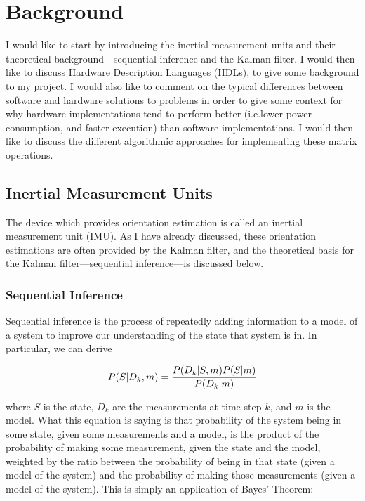 \documentclass[12pt]{article}
\begin{document}
\section{Background}

I would like to start by introducing the inertial measurement units and their theoretical background---sequential inference and the Kalman filter. I would then like to discuss Hardware Description Languages (HDLs), to give some background to my project. I would also like to comment on the typical differences between software and hardware solutions to problems in order to give some context for why hardware implementations tend to perform better (i.e.\@ lower power consumption, and faster execution) than software implementations. I would then like to discuss the different algorithmic approaches for implementing these matrix operations.

\subsection{Inertial Measurement Units}

The device which provides orientation estimation is called an inertial measurement unit (IMU). As I have already discussed, these orientation estimations are often provided by the Kalman filter, and the theoretical basis for the Kalman filter---sequential inference---is discussed below.

\subsubsection{Sequential Inference}

Sequential inference \cite{morrison_2016} is the process of repeatedly adding information to a model of a system to improve our understanding of the state that system is in. In particular, we can derive \cite{morrison_2016}

\begin{equation}
	\label{si}
	P(S | D_k, m) = {P(D_k | S, m) P(S | m) \over P(D_k | m)}
\end{equation}

\noindent where $S$ is the state, $D_k$ are the measurements at time step $k$, and $m$ is the model. What this equation is saying is that probability of the system being in some state, given some measurements and a model, is the product of the probability of making some measurement, given the state and the model, weighted by the ratio between the probability of being in that state (given a model of the system) and the probability of making those measurements (given a model of the system). This is simply an application of Bayes' Theorem:
\end{document}
